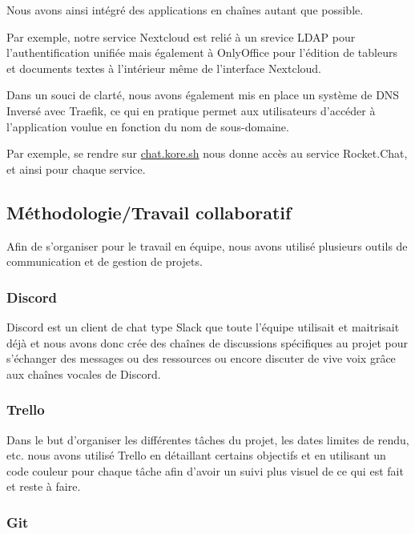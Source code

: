 Nous avons ainsi intégré des applications en chaînes autant que possible.

Par exemple, notre service Nextcloud est relié à un srevice LDAP pour l'authentification unifiée mais également à OnlyOffice pour l'édition de tableurs et documents textes à l'intérieur même de l'interface Nextcloud.

Dans un souci de clarté, nous avons également mis en place un système de DNS Inversé avec Traefik, ce qui en pratique permet aux utilisateurs d'accéder à l'application voulue en fonction du nom de sous-domaine.

Par exemple, se rendre sur \href{http://chat.kore.sh}{chat.kore.sh} nous donne accès au service Rocket.Chat, et ainsi pour chaque service.

\subsection{Méthodologie/Travail collaboratif}

Afin de s'organiser pour le travail en équipe, nous avons utilisé plusieurs outils de communication et de gestion de projets.

\subsubsection{Discord}

Discord est un client de chat type Slack que toute l'équipe utilisait et maitrisait déjà et nous avons donc crée des chaînes de discussions spécifiques au projet pour s'échanger des messages ou des ressources ou encore discuter de vive voix grâce aux chaînes vocales de Discord.

\subsubsection{Trello}

Dans le but d'organiser les différentes tâches du projet, les dates limites de rendu, etc. nous avons utilisé Trello en détaillant certains objectifs et en utilisant un code couleur pour chaque tâche afin d'avoir un suivi plus visuel de ce qui est fait et reste à faire.

\subsubsection{Git}

